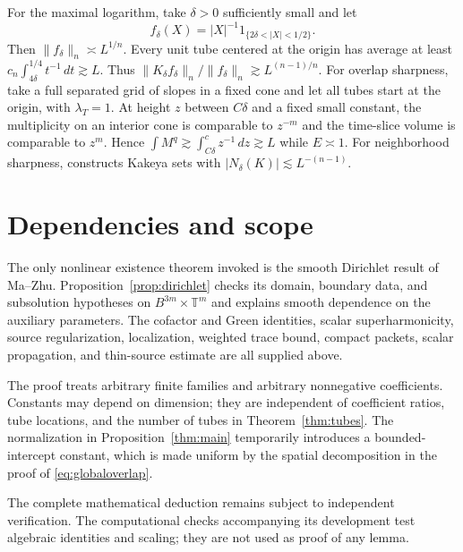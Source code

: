 \documentclass[11pt]{article}
\numberwithin{equation}{section}
\newcommand{\dd}{\,d}
\begin{document}
For the maximal logarithm, take $\delta>0$ sufficiently small and let
\[
 f_\delta(X)=|X|^{-1}1_{\{2\delta<|X|<1/2\}}.
\]
Then $\|f_\delta\|_n\asymp L^{1/n}$. Every unit tube centered at the
origin has average at least
$c_n\int_{4\delta}^{1/4}t^{-1}\dd t\gtrsim L$.
Thus $\|K_\delta f_\delta\|_n/\|f_\delta\|_n
\gtrsim L^{(n-1)/n}$.
For overlap sharpness, take a full separated grid of slopes in a
fixed cone and let all tubes start at the origin, with
$\lambda_T=1$. At height $z$ between $C\delta$ and a fixed small
constant, the multiplicity on an interior cone is comparable to
$z^{-m}$ and the time-slice volume is comparable to $z^m$.
Hence $\int M^q\gtrsim\int_{C\delta}^c z^{-1}\dd z\gtrsim L$
while $E\asymp1$.
For neighborhood sharpness, \cite[Theorem 1.3]{Construction}
constructs Kakeya sets with
$|N_\delta(K)|\lesssim L^{-(n-1)}$.

\section{Dependencies and scope}

The only nonlinear existence theorem invoked is the smooth Dirichlet
result of Ma--Zhu. Proposition~\ref{prop:dirichlet} checks its domain,
boundary data, and subsolution hypotheses on
$B^{3m}\times\mathbb T^m$ and explains smooth dependence on the
auxiliary parameters. The cofactor and Green identities, scalar
superharmonicity, source regularization, localization, weighted trace
bound, compact packets, scalar propagation, and thin-source estimate
are all supplied above.

The proof treats arbitrary finite families and arbitrary nonnegative
coefficients. Constants may depend on dimension; they are independent
of coefficient ratios, tube locations, and the number of tubes in
Theorem~\ref{thm:tubes}. The normalization in
Proposition~\ref{thm:main} temporarily introduces a bounded-intercept
constant, which is made uniform by the spatial decomposition in the
proof of \eqref{eq:globaloverlap}.

The complete mathematical deduction remains subject to independent
verification. The computational checks accompanying its development
test algebraic identities and scaling; they are not used as proof
of any lemma.
\end{document}
